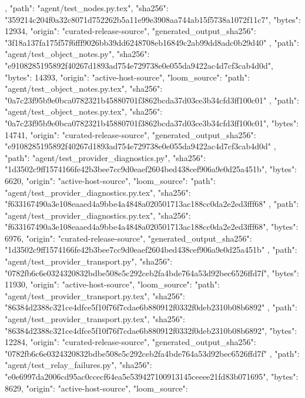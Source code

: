 {{{      }
    },
    {
      "path": "agent/test_nodes.py.tex",
      "sha256": "359214c204f0a32c8071d752262b5a11e99e3908aa744ab15f5738a1072f11c7",
      "bytes": 12934,
      "origin": "curated-release-source",
      "generated_output_sha256": "3f18a137fa175f57f6fff9026bb39dd6248708eb16849c2ab99dd8adc0b29d40"
    },
    {
      "path": "agent/test_object_notes.py",
      "sha256": "e9108285195892f40267d1893ad754e729738e0e055da9422ac4d7cf3cab4d0d",
      "bytes": 14393,
      "origin": "active-host-source",
      "loom_source": {
        "path": "agent/test_object_notes.py.tex",
        "sha256": "0a7c23f95b9e0bca0782321b45880701f3862bcda37d03ce3b34cfd3ff100c01"
      }
    },
    {
      "path": "agent/test_object_notes.py.tex",
      "sha256": "0a7c23f95b9e0bca0782321b45880701f3862bcda37d03ce3b34cfd3ff100c01",
      "bytes": 14741,
      "origin": "curated-release-source",
      "generated_output_sha256": "e9108285195892f40267d1893ad754e729738e0e055da9422ac4d7cf3cab4d0d"
    },
    {
      "path": "agent/test_provider_diagnostics.py",
      "sha256": "1d3502c9ff1574166fe42b3bee7cc9d0eaef2604bed438cef906a9e0d25a451b",
      "bytes": 6620,
      "origin": "active-host-source",
      "loom_source": {
        "path": "agent/test_provider_diagnostics.py.tex",
        "sha256": "f633167490a3e108eaaed4a9bbe4a4848a020501713ac188cc0da2e2ed3fff68"
      }
    },
    {
      "path": "agent/test_provider_diagnostics.py.tex",
      "sha256": "f633167490a3e108eaaed4a9bbe4a4848a020501713ac188cc0da2e2ed3fff68",
      "bytes": 6976,
      "origin": "curated-release-source",
      "generated_output_sha256": "1d3502c9ff1574166fe42b3bee7cc9d0eaef2604bed438cef906a9e0d25a451b"
    },
    {
      "path": "agent/test_provider_transport.py",
      "sha256": "0782fb6c6e0324320832bdbe508e5c292ceb2fa4bde764a53d92bec6526ffd7f",
      "bytes": 11930,
      "origin": "active-host-source",
      "loom_source": {
        "path": "agent/test_provider_transport.py.tex",
        "sha256": "86384d2388c321ce4dfce5f10f76f7cdae6b880912f0332f0deb2310b08b6892"
      }
    },
    {
      "path": "agent/test_provider_transport.py.tex",
      "sha256": "86384d2388c321ce4dfce5f10f76f7cdae6b880912f0332f0deb2310b08b6892",
      "bytes": 12284,
      "origin": "curated-release-source",
      "generated_output_sha256": "0782fb6c6e0324320832bdbe508e5c292ceb2fa4bde764a53d92bec6526ffd7f"
    },
    {
      "path": "agent/test_relay_failures.py",
      "sha256": "e0e6997da2006cd95ac0ccecf64ea5e539427100913145ceeee21fd83b071695",
      "bytes": 8629,
      "origin": "active-host-source",
      "loom_source": {
}}}
